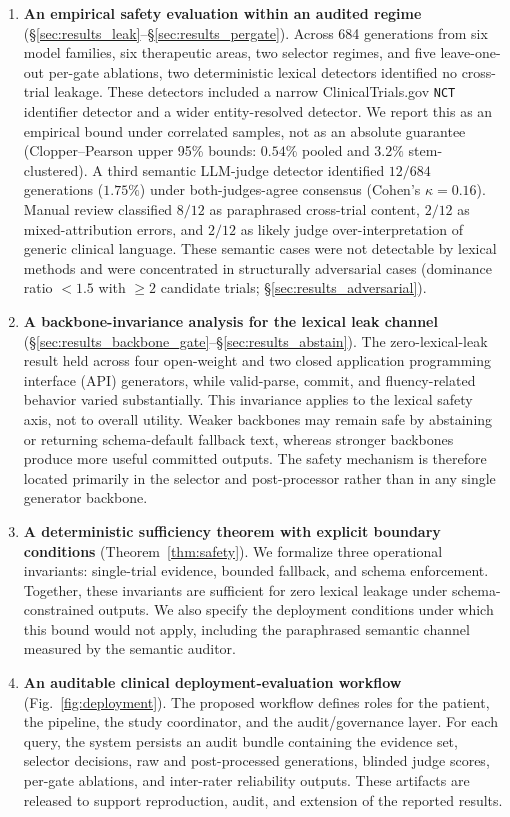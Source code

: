 \documentclass[pdflatex,Numbered]{sn-jnl}
\theoremstyle{plain}
\begin{document}
\begin{enumerate}
\item \textbf{An empirical safety evaluation within an audited regime} (\S\ref{sec:results_leak}--\S\ref{sec:results_pergate}). Across 684 generations from six model families, six therapeutic areas, two selector regimes, and five leave-one-out per-gate ablations, two deterministic lexical detectors identified no cross-trial leakage. These detectors included a narrow ClinicalTrials.gov \texttt{NCT} identifier detector and a wider entity-resolved detector. We report this as an empirical bound under correlated samples, not as an absolute guarantee (Clopper--Pearson upper 95\% bounds: $0.54\%$ pooled and $3.2\%$ stem-clustered). A third semantic LLM-judge detector identified $12/684$ generations ($1.75\%$) under both-judges-agree consensus (Cohen's $\kappa = 0.16$). Manual review classified $8/12$ as paraphrased cross-trial content, $2/12$ as mixed-attribution errors, and $2/12$ as likely judge over-interpretation of generic clinical language. These semantic cases were not detectable by lexical methods and were concentrated in structurally adversarial cases (dominance ratio $<1.5$ with $\geq 2$ candidate trials; \S\ref{sec:results_adversarial}).

\item \textbf{A backbone-invariance analysis for the lexical leak channel} (\S\ref{sec:results_backbone_gate}--\S\ref{sec:results_abstain}). The zero-lexical-leak result held across four open-weight and two closed application programming interface (API) generators, while valid-parse, commit, and fluency-related behavior varied substantially. This invariance applies to the lexical safety axis, not to overall utility. Weaker backbones may remain safe by abstaining or returning schema-default fallback text, whereas stronger backbones produce more useful committed outputs. The safety mechanism is therefore located primarily in the selector and post-processor rather than in any single generator backbone.

\item \textbf{A deterministic sufficiency theorem with explicit boundary conditions} (Theorem~\ref{thm:safety}). We formalize three operational invariants: single-trial evidence, bounded fallback, and schema enforcement. Together, these invariants are sufficient for zero lexical leakage under schema-constrained outputs. We also specify the deployment conditions under which this bound would not apply, including the paraphrased semantic channel measured by the semantic auditor.

\item \textbf{An auditable clinical deployment-evaluation workflow} (Fig.~\ref{fig:deployment}). The proposed workflow defines roles for the patient, the pipeline, the study coordinator, and the audit/governance layer. For each query, the system persists an audit bundle containing the evidence set, selector decisions, raw and post-processed generations, blinded judge scores, per-gate ablations, and inter-rater reliability outputs. These artifacts are released to support reproduction, audit, and extension of the reported results.
\end{enumerate}
\end{document}
